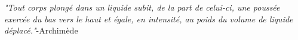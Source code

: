 ﻿\documentclass[a4paper]{article}
\begin{document}
\pagestyle{fancy}
\fancyhf{}
\setlength{\headheight}{15pt}

\begin{center}
	\large{}
\end{center}


\emph{"Tout corps plongé dans un liquide subit, de la part de celui-ci, une poussée exercée du bas vers le haut et égale, en intensité, au poids du volume de liquide déplacé."}\quad-Archimède\\
\end{document}
